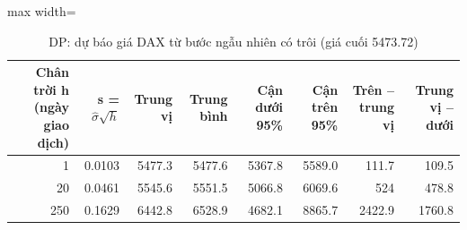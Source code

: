 \begin{table}[H]
\centering\footnotesize
\caption{DP: dự báo giá DAX từ bước ngẫu nhiên có trôi (giá cuối 5473.72)}\label{tab:tab_b12_09_dp_forecast}
\begin{adjustbox}{max width=\linewidth}
\begin{tabular}{|r|r|r|r|r|r|r|r|}
\toprule
Chân trời h (ngày giao dịch) & s = $\hat{\sigma}\sqrt{h}$ & Trung vị & Trung bình & Cận dưới 95\% & Cận trên 95\% & Trên – trung vị & Trung vị – dưới \\
\midrule
1 & 0.0103 & 5477.3 & 5477.6 & 5367.8 & 5589.0 & 111.7 & 109.5 \\
20 & 0.0461 & 5545.6 & 5551.5 & 5066.8 & 6069.6 & 524 & 478.8 \\
250 & 0.1629 & 6442.8 & 6528.9 & 4682.1 & 8865.7 & 2422.9 & 1760.8 \\
\bottomrule
\end{tabular}
\end{adjustbox}
\end{table}
